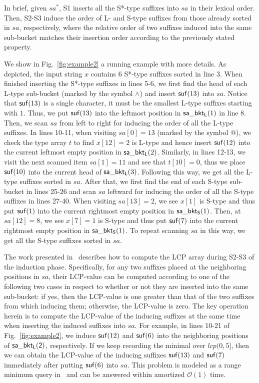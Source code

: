 \documentclass[10pt,journal,compsoc]{IEEEtran}
\begin{document}
In brief, given $sa^*$, S1 inserts all the S*-type suffixes into $sa$ in their lexical order. Then, S2-S3 induce the order of L- and S-type suffixes from those already sorted in $sa$, respectively, where the relative order of two suffixes induced into the same sub-bucket matches their insertion order according to the previously stated property. 

We show in Fig.~\ref{fig:example2} a running example with more details. As depicted, the input string $x$ contains 6 S*-type suffixes sorted in line 3. When finished inserting the S*-type suffixes in lines 5-6, we first find the head of each L-type sub-bucket (marked by the symbol $\wedge$) and insert ${\sf suf}(13)$ into $sa$. Notice that ${\sf suf}(13)$ is a single character, it must be the smallest L-type suffixes starting with $1$. Thus, we put ${\sf suf}(13)$ into the leftmost position in ${\sf sa\_bkt_L}(1)$ in line 8. Then, we scan $sa$ from left to right for inducing the order of all the L-type suffixes. In lines 10-11, when visiting $sa[0] = 13$ (marked by the symbol $@$), we check the type array $t$ to find $x[12] = 2$ is L-type and hence insert ${\sf suf}(12)$ into the current leftmost empty position in ${\sf sa\_bkt_L}(2)$. Similarly, in lines 12-13, we visit the next scanned item $sa[1] = 11$ and see that $t[10] = 0$, thus we place ${\sf suf}(10)$ into the current head of ${\sf sa\_bkt_L}(3)$. Following this way, we get all the L-type suffixes sorted in $sa$. After that, we first find the end of each S-type sub-bucket in lines 25-26 and scan $sa$ leftward for inducing the order of all the S-type suffixes in lines 27-40. When visiting $sa[13] = 2$, we see $x[1]$ is S-type and thus put ${\sf suf}(1)$ into the current rightmost empty position in ${\sf sa\_bkt_S}(1)$. Then, at $sa[12] = 8$, we see $x[7] = 1$ is S-type and thus put ${\sf suf}(7)$ into the current rightmost empty position in ${\sf sa\_bkt_S}(1)$. To repeat scanning $sa$ in this way, we get all the S-type suffixes sorted in $sa$. 

The work presented in~\cite{Fischer11} describes how to compute the LCP array during S2-S3 of the induction phase. Specifically, for any two suffixes placed at the neighboring positions in $sa$, their LCP-value can be computed according to one of the following two cases in respect to whether or not they are inserted into the same sub-bucket: if yes, then the LCP-value is one greater than that of the two suffixes from which inducing them; otherwise, the LCP-value is zero. The key operation herein is to compute the LCP-value of the inducing suffixes at the same time when inserting the induced suffixes into $sa$. For example, in lines 10-21 of Fig.~\ref{fig:example2}, we induce ${\sf suf}(12)$ and ${\sf suf}(6)$ into the neighboring positions of ${\sf sa\_bkt_L(2)}$, respectively. If we keep recording the minimal over $lcp(0, 5]$, then we can obtain the LCP-value of the inducing suffixes ${\sf suf}(13)$ and ${\sf suf}(7)$ immediately after putting ${\sf suf}(6)$ into $sa$. This problem is modeled as a range minimum query in~\cite{Fischer11} and can be answered within amortized $\mathcal{O}(1)$ time. 
\end{document}
